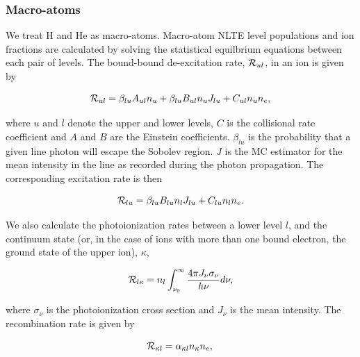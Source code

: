 \documentclass[preprint, a4paper, 11pt]{aastex}
\begin{document}
{\subsubsection{Macro-atoms}
We treat H and He as macro-atoms. 
Macro-atom NLTE level populations and ion fractions are calculated by solving 
the statistical equilbrium equations between each pair of levels. The bound-bound 
de-excitation rate, ${\cal R}_{ul}$, in an ion is given by

\begin{equation}
{\cal R}_{ul} = \beta_{lu} A_{ul} n_u + \beta_{lu} B_{ul} n_u J_{lu} + C_{ul} n_u n_e,\label{eq:nlte_rul}
\end{equation}

where $u$ and $l$ denote the upper and lower levels, $C$ is the collisional rate coefficient
and $A$ and $B$ are the Einstein coefficients. $\beta_{lu}$ is the probability that a 
given line photon will escape the Sobolev region. $J$ is the MC estimator for the mean intensity in the line as 
recorded during the photon propagation. The corresponding excitation rate is then

\begin{equation}
{\cal R}_{lu} = \beta_{lu} B_{lu} n_l J_{lu} + C_{lu} n_l n_e.
\end{equation}

We also calculate the photoionization rates between a lower level $l$,
and the continuum state (or, in the case of ions with more than one 
bound electron, the ground state of the upper ion), $\kappa$,

\begin{equation}
{\cal R}_{l \kappa}= n_l \int_{\nu_0}^{\infty} \frac{ 4 \pi J_{\nu} \sigma_{\nu}}{h \nu} d\nu,
\end{equation}

where $\sigma_{\nu}$ is the photoionization cross section and $J_{\nu}$ is the mean intensity. 
The recombination rate is given by 

\begin{equation}
{\cal R}_{\kappa l} = \alpha_{\kappa l} n_{\kappa} n_e, \\
\end{equation}

}
\end{document}
